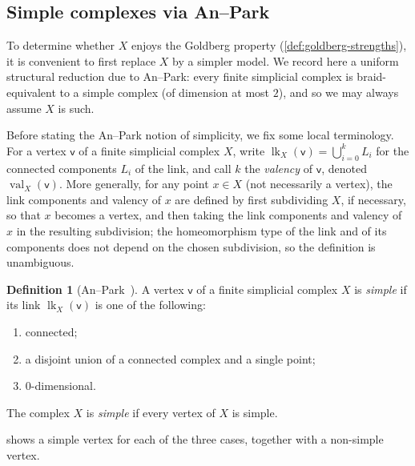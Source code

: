 \documentclass[reqno]{amsart}
\theoremstyle{definition}
\newtheorem{definition}[theorem]{Definition}
\newcommand\sfv{\mathsf{v}}
\DeclareMathOperator{\lk}{lk}
\DeclareMathOperator{\val}{val}
\numberwithin{equation}{section}
\begin{document}
\subsection{Simple complexes via An--Park}
\label{ssec:simple-an-park}

To determine whether \(X\) enjoys the Goldberg property (\cref{def:goldberg-strengths}), it is convenient to
first replace \(X\) by a simpler model. We record here a uniform
structural reduction due to An--Park: every finite simplicial
complex is braid-equivalent to a simple complex (of dimension at
most \(2\)), and so we may always assume \(X\) is such.

Before stating the An--Park notion of simplicity, we fix some
local terminology. For a vertex \(\sfv\) of a finite simplicial
complex \(X\), write \(\lk_X(\sfv)=\bigcup_{i=0}^k L_i\) for the connected
components \(L_i\) of the link, and call \(k\) the
\emph{valency} of \(\sfv\), denoted \(\val_X(\sfv)\). More
generally, for any point \(x\in X\) (not necessarily a vertex),
the link components and valency of \(x\) are defined by first
subdividing \(X\), if necessary, so that \(x\) becomes a vertex, and
then taking the link components and valency of \(x\) in the
resulting subdivision; the homeomorphism type of the link and of
its components does not depend on the chosen subdivision, so the
definition is unambiguous.

\begin{definition}[{An--Park~\cite[Def.~2.7]{AnPark2017}}]
\label{def:simple-complex}
A vertex \(\sfv\) of a finite simplicial complex \(X\) is \emph{simple}
if its link \(\lk_X(\sfv)\) is one of the following:
\begin{enumerate}[label=(\roman*), leftmargin=2em]
    \item connected;
    \item a disjoint union of a connected complex and a single
          point;
    \item \(0\)-dimensional.
\end{enumerate}
The complex \(X\) is \emph{simple} if every vertex of \(X\) is simple.
\end{definition}

 shows a simple vertex for each of
the three cases, together with a non-simple vertex.
\end{document}

